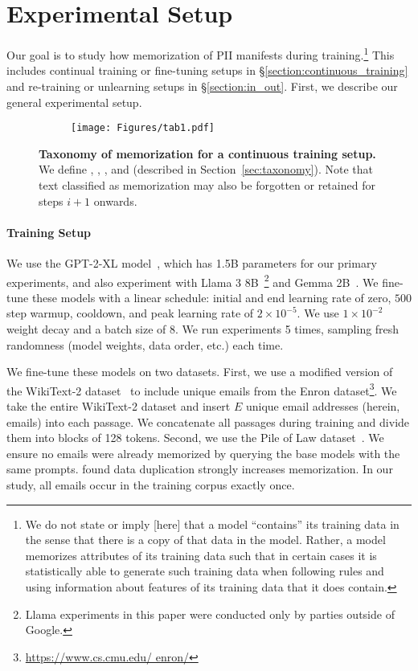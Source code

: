 
\section{Experimental Setup}
\label{sec:prelim}
Our goal is to study how memorization of PII manifests during training.\footnote{We do not state or imply [here] that a model ``contains'' its training data in the sense that there is a copy of that data in the model.  Rather, a model memorizes attributes of its training data such that in certain cases it is statistically able to generate such training data when following rules and using information about features of its training data that it does contain.} This includes continual training or fine-tuning setups in \S\ref{section:continuous_training} and re-training or unlearning setups in \S\ref{section:in_out}. First, we describe our general experimental setup.


\begin{figure}[t]
   \centering
    \begin{subfigure}[t]{0.5\textwidth}
    \vskip 0pt  %
    \texttt{[image: Figures/tab1.pdf]}
    \end{subfigure}
  \caption{\textbf{Taxonomy of memorization for a continuous training setup.} We define \novel, \retained, \forgotten, and \assisted (described in Section~\ref{sec:taxonomy}). Note that text classified as \assisted memorization may also be forgotten or retained for steps $i+1$ onwards.}
  \vspace{-0.5em}
  \label{fig:taxonomy}
\end{figure}

 
\paragraph{Training Setup}
We use the GPT-2-XL model~\cite{radford2019language}, which has 1.5B parameters for our primary experiments, and also experiment with Llama 3 8B~\citep{dubey2024llama3herdmodels}\footnote{Llama experiments in this paper were conducted only by parties outside of Google.} and Gemma 2B~\citep{team2024gemma}. We fine-tune these models with a linear schedule: initial and end learning rate of zero, $500$ step warmup, cooldown, and peak learning rate of $2 \times10^{-5}$. We use $1 \times10^{-2}$ weight decay and a batch size of $8$. We run experiments 5 times, sampling fresh randomness (model weights, data order, etc.) each time. 

We fine-tune these models on two datasets. First, we use a modified version of the WikiText-2 dataset~\cite{merity2016pointer} to include unique emails from the Enron dataset\footnote{\url{https://www.cs.cmu.edu/ enron/}}. We take the entire WikiText-2 dataset and insert %
\(E\) unique email addresses (herein, emails) into each passage. We concatenate all passages during training and divide them into blocks of 128 tokens.
Second, we use the Pile of Law dataset~\citep{henderson2022pile}.
We ensure no emails were already memorized by querying the base models with the same prompts.
\citet{lee-etal-2022-deduplicating} found data duplication strongly increases memorization. 
In our study, all emails occur in the training corpus exactly once. %


